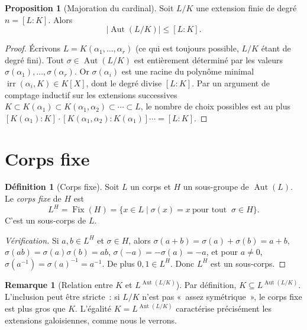 \documentclass[12pt,a4paper,openany]{book}
\theoremstyle{definition}
\newtheorem{definition}{Définition}[chapter]
\newtheorem{proposition}{Proposition}[chapter]
\newtheorem{remarque}{Remarque}[chapter]
\newcommand{\Aut}{\operatorname{Aut}}
\newcommand{\irr}{\operatorname{irr}}
\newcommand{\Fix}{\operatorname{Fix}}
\begin{document}
\begin{proposition}[Majoration du cardinal]\label{prop:majoration-aut}
Soit $L/K$ une extension finie de degré $n = [L:K]$. Alors
\[
  |\Aut(L/K)| \leq [L:K].
\]
\end{proposition}

\begin{proof}
Écrivons $L = K(\alpha_1, \ldots, \alpha_r)$ (ce qui est toujours possible,
$L/K$ étant de degré fini). Tout $\sigma \in \Aut(L/K)$ est entièrement
déterminé par les valeurs $\sigma(\alpha_1), \ldots, \sigma(\alpha_r)$.
Or $\sigma(\alpha_i)$ est une racine du polynôme minimal
$\irr(\alpha_i, K) \in K[X]$, dont le degré divise $[L:K]$. Par un argument
de comptage inductif sur les extensions successives
$K \subset K(\alpha_1) \subset K(\alpha_1,\alpha_2) \subset \cdots \subset L$,
le nombre de choix possibles est au plus
$[K(\alpha_1):K] \cdot [K(\alpha_1,\alpha_2):K(\alpha_1)] \cdots = [L:K]$.
\end{proof}

\section{Corps fixe}\label{sec:corps-fixe}

\begin{definition}[Corps fixe]\label{def:corps-fixe}
Soit $L$ un corps et $H$ un sous-groupe de $\Aut(L)$. Le \emph{corps fixe}
de $H$ est
\[
  L^H = \Fix(H) = \{x \in L \mid \sigma(x) = x\ \text{pour tout }\
  \sigma \in H\}.
\]
C'est un sous-corps de $L$.
\end{definition}

\begin{proof}[Vérification]
Si $a, b \in L^H$ et $\sigma \in H$, alors
$\sigma(a + b) = \sigma(a) + \sigma(b) = a + b$,
$\sigma(ab) = \sigma(a)\sigma(b) = ab$,
$\sigma(-a) = -\sigma(a) = -a$, et pour $a \neq 0$,
$\sigma(a^{-1}) = \sigma(a)^{-1} = a^{-1}$. De plus $0, 1 \in L^H$.
Donc $L^H$ est un sous-corps.
\end{proof}

\begin{remarque}[Relation entre $K$ et $L^{\Aut(L/K)}$]\label{rem:corps-fixe-inclusion}
Par définition, $K \subseteq L^{\Aut(L/K)}$. L'inclusion peut être
stricte~: si $L/K$ n'est pas «~assez symétrique~», le corps fixe est
plus gros que $K$. L'égalité $K = L^{\Aut(L/K)}$ caractérise précisément
les extensions galoisiennes, comme nous le verrons.
\end{remarque}
\end{document}
